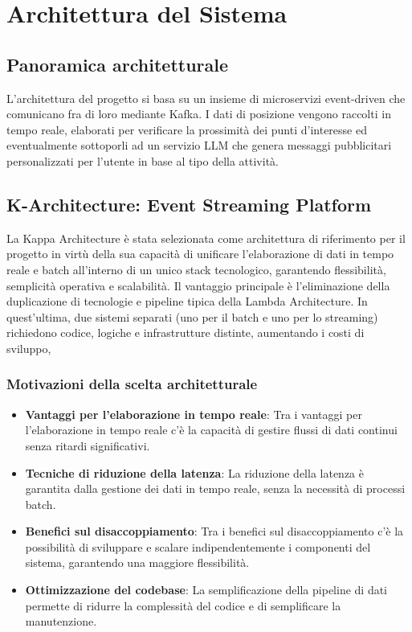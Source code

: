 \documentclass[10pt]{article}
\begin{document}
\newpage
\section{Architettura del Sistema}

\subsection{Panoramica architetturale}
L'architettura del progetto si basa su un insieme di microservizi event-driven che comunicano fra di loro mediante Kafka. I dati di posizione vengono raccolti in tempo reale, elaborati per verificare la prossimità dei punti d'interesse ed eventualmente sottoporli ad un servizio LLM che genera messaggi pubblicitari personalizzati per l'utente in base al tipo della attività.

\subsection{K-Architecture: Event Streaming Platform}
La Kappa Architecture è stata selezionata come architettura di riferimento per il progetto in virtù della sua capacità di unificare l’elaborazione di dati in tempo reale e batch all’interno di un unico stack tecnologico, garantendo flessibilità, semplicità operativa e scalabilità. Il vantaggio principale è l’eliminazione della duplicazione di tecnologie e pipeline tipica della Lambda Architecture. In quest’ultima, due sistemi separati (uno per il batch e uno per lo streaming) richiedono codice, logiche e infrastrutture distinte, aumentando i costi di sviluppo,
    \subsubsection{Motivazioni della scelta architetturale}
        \begin{itemize}
        \item \textbf{Vantaggi per l'elaborazione in tempo reale}: Tra i vantaggi per l'elaborazione in tempo reale c'è la capacità di gestire flussi di dati continui senza ritardi significativi.
        \item \textbf{Tecniche di riduzione della latenza}: La riduzione della latenza è garantita dalla gestione dei dati in tempo reale, senza la necessità di processi batch.
        \item \textbf{Benefici sul disaccoppiamento}: Tra i benefici sul disaccoppiamento c'è la possibilità di sviluppare e scalare indipendentemente i componenti del sistema, garantendo una maggiore flessibilità.
        \item \textbf{Ottimizzazione del codebase}: La semplificazione della pipeline di dati permette di ridurre la complessità del codice e di semplificare la manutenzione.
    \end{itemize}
\end{document}
